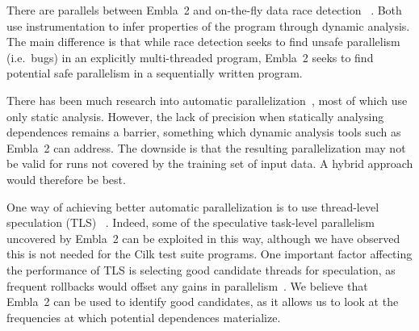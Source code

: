 There are parallels between Embla~2 and on-the-fly data race detection~
\cite{MellorCrummey91onthefly,savage97eraser}.  Both use
instrumentation to infer properties of the program through dynamic
analysis.  The main difference is that while race detection seeks to
find unsafe parallelism (i.e.\ bugs) in an explicitly multi-threaded
program, Embla~2 seeks to find potential safe parallelism in a
sequentially written program.

There has been much research into automatic parallelization~\cite{kennedy02optimizing,Blume94polaris},
most of which use only static analysis.  However,
the lack of precision when statically analysing dependences remains a
barrier, something which dynamic analysis tools such as Embla~2 can address.
The downside is that the resulting parallelization may not be valid
for runs not covered by the training set of input data.
A hybrid approach would therefore be best.

One way of achieving better automatic parallelization is to use
thread-level speculation (TLS)~
\cite{Rundberg01anall-software,gregory05stampede}.
Indeed, some of the speculative
task-level parallelism uncovered by Embla~2 can be exploited in
this way, 
although we have observed this is not needed for the Cilk test suite programs.
One important factor affecting the performance of TLS is
selecting good candidate threads for speculation, as frequent
rollbacks would offset any gains in parallelism~\cite{johnson04mincut,liu06posh}.
We believe that Embla~2 can be used to identify good
candidates, as it allows us to look at the frequencies at which
potential dependences materialize.
